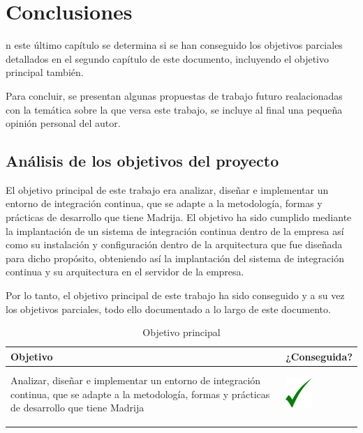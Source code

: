 \chapter{Conclusiones}

n este último capítulo se determina si se han conseguido los objetivos parciales detallados en el segundo capítulo de este documento, incluyendo el objetivo principal también.

Para concluir, se presentan algunas propuestas de trabajo futuro realacionadas con la temática sobre la que versa este trabajo, se incluye al final una pequeña opinión personal del autor.

\section{Análisis de los objetivos del proyecto}
El objetivo principal de este trabajo era analizar, diseñar e implementar un entorno de integración continua, que se adapte a la metodología, formas y prácticas de desarrollo que tiene \ac{Madrija}. El objetivo ha sido cumplido mediante la implantación de un sistema de integración continua dentro de la empresa así como su instalación y configuración dentro de la arquitectura que fue diseñada para dicho propósito, obteniendo así la implantación del sistema de integración continua y su arquitectura en el servidor de la empresa.

Por lo tanto, el objetivo principal de este trabajo ha sido conseguido y a su vez los objetivos parciales, todo ello documentado a lo largo de este documento.

\begin{center}
\begin{longtable}{p{} p{}}
\hline \hline
  \rowcolor{gray!25}\textbf{Objetivo} & \textbf{¿Conseguida?} \\
    \hline \hline
    Analizar, diseñar e implementar un entorno de integración continua, que se adapte a la metodología, formas y prácticas de desarrollo que tiene \ac{Madrija} & \begin{center} \includegraphics[width=1cm]{tick.png} \end{center}\\
    \hline \hline
    \caption{Objetivo principal}
\end{longtable}
\end{center} 

